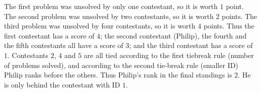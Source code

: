 The first problem was unsolved by only one contestant, so it is worth $1$ point. The second problem was unsolved by two contestants, so it is worth $2$ points. The third problem was unsolved by four contestants, so it is worth $4$ points. Thus the first contestant has a score of $4$; the second contestant (Philip), the fourth and the fifth contestants all have a score of $3$; and the third contestant has a score of $1$. Contestants $2$, $4$ and $5$ are all tied according to the first tiebreak rule (number of problems solved), and according to the second tie-break rule (smaller ID) Philip ranks before the others. Thus Philip's rank in the final standings is 2. He is only behind the
contestant with ID $1$. 